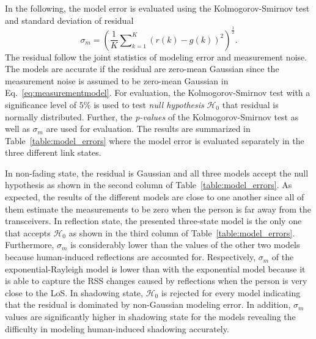 \documentclass[journal, 10pt, twocolumn, balance]{IEEEtran}
\begin{document}
In the following, the model error is evaluated using the Kolmogorov-Smirnov test and standard deviation of residual
\begin{equation} \label{eq:model_error}
	\sigma_m = \left( \frac{1}{K} \displaystyle\sum\nolimits_{k=1}^K \left( r(k) - g(k) \right)^2 \right)^{\frac{1}{2}}.
\end{equation}
The residual follow the joint statistics of modeling error and measurement noise. The models are accurate if the residual are zero-mean Gaussian since the measurement noise is assumed to be zero-mean Gaussian in Eq.~\eqref{eq:measurementmodel}. For evaluation, the Kolmogorov-Smirnov test with a significance level of $5\%$ is used to test \emph{null hypothesis} $\mathcal{H}_0$ that residual is normally distributed. Further, the \emph{p-values} of the Kolmogorov-Smirnov test as well as $\sigma_m$ are used for evaluation. The results are summarized in Table~\ref{table:model_errors} where the model error is evaluated separately in the three different link states. 

In non-fading state, the residual is Gaussian and all three models accept the null hypothesis as shown in the second column of Table~\ref{table:model_errors}. As expected, the results of the different models are close to one another since all of them estimate the measurements to be zero when the person is far away from the transceivers. In reflection state, the presented three-state model is the only one that accepts $\mathcal{H}_0$ as shown in the third column of Table~\ref{table:model_errors}. Furthermore, $\sigma_m$ is considerably lower than the values of the other two models because human-induced reflections are accounted for. Respectively, $\sigma_m$ of the exponential-Rayleigh model is lower than with the exponential model because it is able to capture the RSS changes caused by reflections when the person is very close to the LoS. In shadowing state, $\mathcal{H}_0$ is rejected for every model indicating that the residual is dominated by non-Gaussian modeling error. In addition, $\sigma_m$ values are significantly higher in shadowing state for the models revealing the difficulty in modeling human-induced shadowing accurately. 
\end{document}
